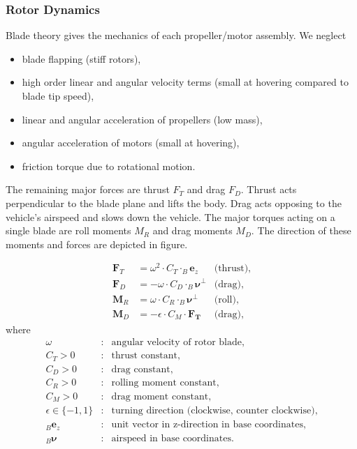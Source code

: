 \subsubsection{Rotor Dynamics}
Blade theory gives the mechanics of each propeller/motor assembly. We neglect 
\begin{itemize} 
\item blade flapping (stiff rotors),
\item high order linear and angular velocity terms (small at hovering compared to blade tip speed),
\item linear and angular acceleration of propellers (low mass),
\item angular acceleration of motors (small at hovering),
\item friction torque due to rotational motion.
\end{itemize}

The remaining major forces are thrust $F_T$ and drag $F_D$. Thrust acts perpendicular to the blade plane and lifts the body. Drag acts opposing to the vehicle's airspeed and slows down the vehicle. The major torques acting on a single blade are roll moments $M_R$ and drag moments $M_D$. The direction of these moments and forces are depicted in figure. 

\begin{align}
\mathbf{F}_T&= \omega^2 \cdot C_T \cdot _B\mathbf{e}_z  &\text{(thrust)} ,\label{eq:rotor_begin} \\
\mathbf{F}_D&= -\omega \cdot  C_D \cdot _B\mathbf{\boldsymbol{\nu}}^\perp  &\text{(drag)} ,\\
\mathbf{M}_R&= \omega \cdot C_R \cdot _B\mathbf{\boldsymbol{\nu}}^\perp &\text{(roll)} , \\
\mathbf{M}_D&= -\epsilon \cdot C_M \cdot \mathbf{F_T}  &\text{(drag)}, \label{eq:rotor_end}
\end{align}
where
\begin{align*}
\omega &: &\text{angular velocity of rotor blade}, \\
C_T>0 &: &\text{thrust constant}, \\
C_D>0 &: &\text{drag constant}, \\
C_R>0 &: &\text{rolling moment constant}, \\
C_M>0 &: &\text{drag moment constant}, \\
\epsilon\in\{-1,1\} &: &\text{turning direction (clockwise, counter clockwise)}, \\
_B\mathbf{e}_z &: &\text{unit vector in z-direction in base coordinates},\\
_B\mathbf{\boldsymbol{\nu}} &: &\text{airspeed in base coordinates} .
\end{align*}

